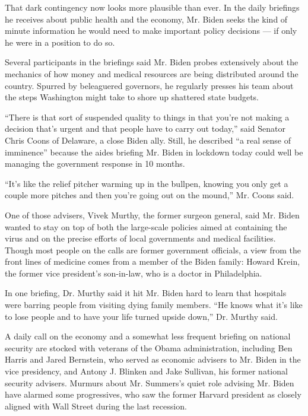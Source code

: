 That dark contingency now looks more plausible than ever. In the daily
briefings he receives about public health and the economy, Mr. Biden
seeks the kind of minute information he would need to make important
policy decisions --- if only he were in a position to do so.

Several participants in the briefings said Mr. Biden probes extensively
about the mechanics of how money and medical resources are being
distributed around the country. Spurred by beleaguered governors, he
regularly presses his team about the steps Washington might take to
shore up shattered state budgets.

``There is that sort of suspended quality to things in that you're not
making a decision that's urgent and that people have to carry out
today,'' said Senator Chris Coons of Delaware, a close Biden ally.
Still, he described ``a real sense of imminence'' because the aides
briefing Mr. Biden in lockdown today could well be managing the
government response in 10 months.

``It's like the relief pitcher warming up in the bullpen, knowing you
only get a couple more pitches and then you're going out on the mound,''
Mr. Coons said.

One of those advisers, Vivek Murthy, the former surgeon general, said
Mr. Biden wanted to stay on top of both the large-scale policies aimed
at containing the virus and on the precise efforts of local governments
and medical facilities. Though most people on the calls are former
government officials, a view from the front lines of medicine comes from
a member of the Biden family: Howard Krein, the former vice president's
son-in-law, who is a doctor in Philadelphia.

In one briefing, Dr. Murthy said it hit Mr. Biden hard to learn that
hospitals were barring people from visiting dying family members. ``He
knows what it's like to lose people and to have your life turned upside
down,'' Dr. Murthy said.

A daily call on the economy and a somewhat less frequent briefing on
national security are stocked with veterans of the Obama administration,
including Ben Harris and Jared Bernstein, who served as economic
advisers to Mr. Biden in the vice presidency, and Antony J. Blinken and
Jake Sullivan, his former national security advisers. Murmurs about Mr.
Summers's quiet role advising Mr. Biden have alarmed some progressives,
who saw the former Harvard president as closely aligned with Wall Street
during the last recession.


